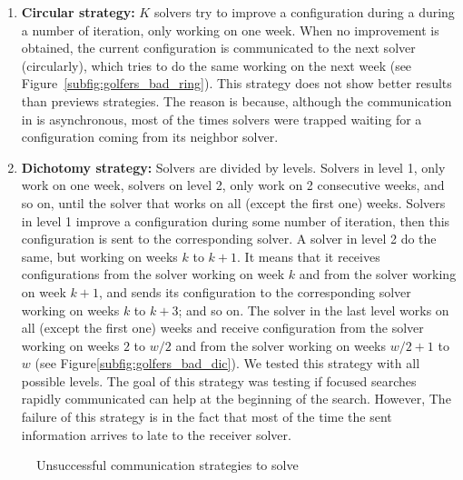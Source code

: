 \begin{enumerate}[label=\Alph*]
\item \textbf{Circular strategy:} $K$ solvers try to improve a configuration during a during a number of iteration, only working on one week. When no improvement is obtained, the current configuration is communicated to the next solver (circularly), which tries to do the same working on the next week (see Figure~\ref{subfig:golfers_bad_ring}).
\subitem This strategy does not show better results than previews strategies. The reason is because, although the communication in \posl{} is asynchronous, most of the times solvers were trapped waiting for a configuration coming from its neighbor solver.

\item \textbf{Dichotomy strategy:} Solvers are divided by levels. Solvers in level 1, only work on one week, solvers on level 2, only work on 2 consecutive weeks, and so on, until the solver that works on all (except the first one) weeks. Solvers in level 1 improve a configuration during some number of iteration, then this configuration is sent to the corresponding solver. A solver in level 2 do the same, but working on weeks $k$ to $k+1$. It means that it receives configurations from the solver working on week $k$ and from the solver working on week $k+1$, and sends its configuration to the corresponding solver working on weeks $k$ to $k+3$; and so on. The solver in the last level works on all (except the first one) weeks and receive configuration from the solver working on weeks $2$ to $w/2$ and from the solver working on weeks $w/2+1$ to $w$ (see Figure\ref{subfig:golfers_bad_dic}). We tested this strategy with all possible levels. 
\subitem The goal of this strategy was testing if focused searches rapidly communicated can help at the beginning of the search. However, The failure of this strategy is in the fact that most of the time the sent information arrives to late to the receiver solver.
\end{enumerate}

\begin{figure}[h]
	\centering
	\caption[]{Unsuccessful communication strategies to solve \SGP}
	\label{fig:golfers_bad}
\end{figure}